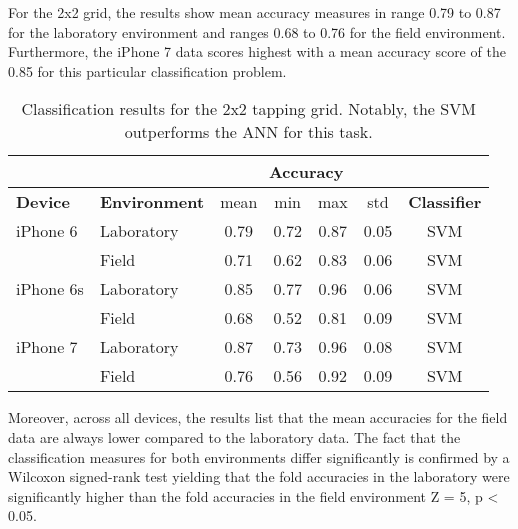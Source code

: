 For the 2x2 grid, the results show mean accuracy measures in range 0.79 to 0.87 for the laboratory environment and ranges 0.68 to 0.76 for the field environment. Furthermore, the iPhone 7 data scores highest with a mean accuracy score of the 0.85 for this particular classification problem.

\begin{table}[h!]
  \centering
  \begin{tabular}{|l|l|c|c|c|c|c|}
    \cline{3-6}
    \multicolumn{2}{c}{} & \multicolumn{4}{|c|}{\textbf{Accuracy}}  \\
    \hline
    \textbf{Device} & \textbf{Environment} & mean &   min &   max  & std &  \textbf{Classifier} \\
    \hline
    iPhone 6 & Laboratory &      0.79 &     0.72 &     0.87 &     0.05 &  SVM \\
    & Field &      0.71 &     0.62 &     0.83 &     0.06 &  SVM \\
    \hline
iPhone 6s     & Laboratory &      0.85 &     0.77 &     0.96 &     0.06 &  SVM \\
& Field &      0.68 &     0.52 &     0.81 &     0.09 &  SVM \\
    \hline
iPhone 7 & Laboratory &      0.87 &     0.73 &     0.96 &     0.08 &  SVM \\
& Field &      0.76 &     0.56 &     0.92 &     0.09 &  SVM \\
    \hline
  \end{tabular}
  \caption{Classification results for the 2x2 tapping grid. Notably, the SVM outperforms the ANN for this task.}
\end{table}



Moreover, across all devices, the results list that the mean accuracies for the field data are always lower compared to the laboratory data. The fact that the classification measures for both environments differ significantly is confirmed by a Wilcoxon signed-rank test yielding that the fold accuracies in the laboratory were significantly higher than the fold accuracies in the field environment Z = 5, p < 0.05.

